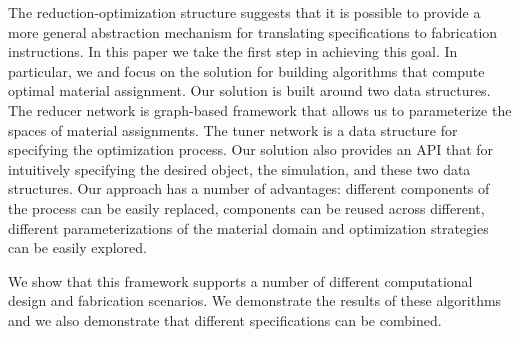 \documentclass[annual]{acmsiggraph}
\begin{document}
The reduction-optimization structure suggests that it is possible to provide a more general abstraction mechanism for translating specifications to fabrication instructions.
In this paper we take the first step in achieving this goal. In particular, we and focus on the solution for building algorithms that compute optimal material assignment. Our solution is built around two data structures. The reducer network is graph-based framework that allows us to parameterize the spaces of material assignments. The tuner network is a data structure for specifying the optimization process. Our solution also provides an API that for intuitively specifying the desired object, the simulation, and these two data structures. Our approach has a number of advantages: different components of the process can be easily replaced, components can be reused across different, different parameterizations of the material domain and optimization strategies can be easily explored. 

We show that this framework supports a number of different computational design and fabrication scenarios. We demonstrate the results of these algorithms and we also demonstrate that different specifications can be combined.  




\end{document}
